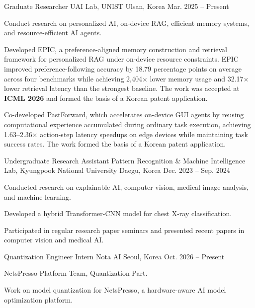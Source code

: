 \documentclass[11pt, a4paper]{awesome-cv}
\begin{document}
\begin{cventries}
  \cventry
    {Graduate Researcher}
    {UAI Lab, UNIST}
    {Ulsan, Korea}
    {Mar. 2025 -- Present}
    {
      \begin{cvitems}
        \item {Conduct research on personalized AI, on-device RAG, efficient memory systems, and resource-efficient AI agents.}
        \item {Developed EPIC, a preference-aligned memory construction and retrieval framework for personalized RAG under on-device resource constraints. EPIC improved preference-following accuracy by 18.79 percentage points on average across four benchmarks while achieving 2,404$\times$ lower memory usage and 32.17$\times$ lower retrieval latency than the strongest baseline. The work was accepted at \textbf{ICML 2026} and formed the basis of a Korean patent application.}
        \item {Co-developed PastForward, which accelerates on-device GUI agents by reusing computational experience accumulated during ordinary task execution, achieving 1.63--2.36$\times$ action-step latency speedups on edge devices while maintaining task success rates. The work formed the basis of a Korean patent application.}
      \end{cvitems}
    }
  \cventry
    {Undergraduate Research Assistant}
    {Pattern Recognition \& Machine Intelligence Lab, Kyungpook National University}
    {Daegu, Korea}
    {Dec. 2023 -- Sep. 2024}
    {
      \begin{cvitems}
        \item {Conducted research on explainable AI, computer vision, medical image analysis, and machine learning.}
        \item {Developed a hybrid Transformer-CNN model for chest X-ray classification.}
        \item {Participated in regular research paper seminars and presented recent papers in computer vision and medical AI.}
      \end{cvitems}
    }
\end{cventries}

\begin{cventries}
  \cventry
    {Quantization Engineer Intern}
    {Nota AI}
    {Seoul, Korea}
    {Oct. 2026 -- Present}
    {
      \begin{cvitems}
        \item {NetsPresso Platform Team, Quantization Part.}
        \item {Work on model quantization for NetsPresso, a hardware-aware AI model optimization platform.}
      \end{cvitems}
    }
\end{cventries}
\end{document}
